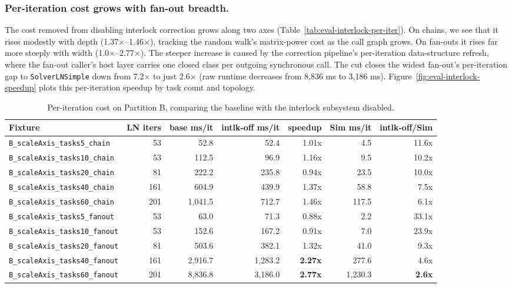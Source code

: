 \subsubsection*{Per-iteration cost grows with fan-out breadth.} 
The cost removed from disabling interlock correction grows along two axes (Table~\ref{tab:eval-interlock-per-iter}). On chains, we see that it rises modestly with depth (1.37$\times$--1.46$\times$), tracking the random walk's matrix-power cost as the call graph grows. On fan-outs it rises far more steeply with width (1.0$\times$--2.77$\times$). The steeper increase is caused by the correction pipeline's per-iteration data-structure refresh, where the fan-out caller's host layer carries one closed class per outgoing synchronous call. The cut closes the widest fan-out's  per-iteration gap to \texttt{SolverLNSimple} down from 7.2$\times$ to just 2.6$\times$ (raw runtime decreases from 8,836 ms to 3,186 ms). Figure~\ref{fig:eval-interlock-speedup} plots this per-iteration speedup by task count and topology.

\begin{table}[h]
\centering
\footnotesize
\setlength{\tabcolsep}{4pt}
\begin{tabular}{|l|r|r|r|r|r|r|}
\hline
Fixture & LN iters & base ms/it & intlk-off ms/it & speedup & Sim ms/it & intlk-off/Sim \\
\hline
\texttt{B\_scaleAxis\_tasks5\_chain}   & 53  & 52.8    & 52.4    & 1.01x & 4.5     & 11.6x \\ \hline
\texttt{B\_scaleAxis\_tasks10\_chain}  & 53  & 112.5   & 96.9    & 1.16x & 9.5     & 10.2x \\ \hline
\texttt{B\_scaleAxis\_tasks20\_chain}  & 81  & 222.2   & 235.8   & 0.94x & 23.5    & 10.0x \\ \hline
\texttt{B\_scaleAxis\_tasks40\_chain}  & 161 & 604.9   & 439.9   & 1.37x & 58.8    & 7.5x  \\ \hline
\texttt{B\_scaleAxis\_tasks60\_chain}  & 201 & 1,041.5 & 712.7   & 1.46x & 117.5   & 6.1x  \\ \hline
\texttt{B\_scaleAxis\_tasks5\_fanout}  & 53  & 63.0    & 71.3    & 0.88x & 2.2     & 33.1x \\ \hline
\texttt{B\_scaleAxis\_tasks10\_fanout} & 53  & 152.6   & 167.2   & 0.91x & 7.0     & 23.9x \\ \hline
\texttt{B\_scaleAxis\_tasks20\_fanout} & 81  & 503.6   & 382.1   & 1.32x & 41.0    & 9.3x  \\ \hline
\texttt{B\_scaleAxis\_tasks40\_fanout} & 161 & 2,916.7 & 1,283.2 & \textbf{2.27x} & 277.6   & 4.6x  \\ \hline
\texttt{B\_scaleAxis\_tasks60\_fanout} & 201 & 8,836.8 & 3,186.0 & \textbf{2.77x} & 1,230.3 & \textbf{2.6x} \\ \hline
\end{tabular}
\caption{Per-iteration cost on Partition B, comparing the baseline with the interlock subsystem disabled.}
\label{tab:eval-interlock-per-iter}
\label{tab:eval-f24-per-partition}
\end{table}

